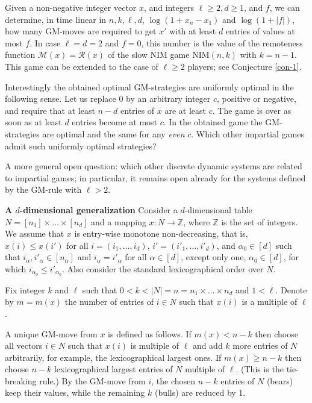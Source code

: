 \documentclass[10pt]{article}
\theoremstyle{definition}
\def\R{\mathcal{R}}
\def\M{\mathcal{M}}
\begin{document}
Given a non-negative integer vector $x$, and  
integers  $\ell \geq 2, d \geq 1$, and $f$,  
we can determine, in time linear in 
$n,k,\ell,d$, $\log(1+x_n-x_1)$ and $\log(1+|f|)$,   
how many GM-moves are required to get 
$x'$  with at least $d$ entries of values at most $f$. 
In case $\ell=d=2$ and $f=0$, this number 
is the value of the remoteness function  $\M(x) = \R(x)$ 
of the slow NIM game NIM$(n,k)$  with $k=n-1$.   
This game can be extended to the case of $\ell \geq 2$ players; 
see Conjecture \ref{con-1}.

Interestingly the obtained optimal GM-strategies 
are uniformly optimal in the following sense. 
Let us replace  0  by an arbitrary 
integer $c$, positive or negative, and  
require that at least  $n - d$ entries of  $x$ are at least $c$. 
The game is over as soon as at least 
$d$  entries become at most  $c$. 
In the obtained game 
the GM-strategies are optimal and 
the same for any {\em even} $c$. 
Which other impartial games admit such 
uniformly optimal strategies? 

A more general open question:     
which other discrete dynamic systems 
are related to impartial games;  
in particular, it remains open 
already for the systems defined 
by the GM-rule with $\ell > 2$. 

 \bigskip 

 {\bf A $d$-dimensional generalization} 
 \newline
 Consider a $d$-dimensional table 
 $N = [n_1] \times \dots \times [n_d]$ 
 and a mapping  $x : N \to \mathbb{Z}$, 
 where $\mathbb{Z}$ is the set of integers. 
 We assume that  $x$  is entry-wise 
 monotone non-decreasing, that is, 
 $x(i) \leq x(i')$  for all 
 $i = (i_1, \dots, i_d)$, 
 $i' = (i'_1, \dots, i'_d)$, 
 and  $\alpha_0 \in [d]$  such that 
$i_\alpha, i'_\alpha \in [n_\alpha]$  and 
 $i_\alpha = i'_\alpha$  for all  $\alpha \in [d]$, 
 except only one, $\alpha_0 \in [d]$,  
 for which  $i_{\alpha_0} \leq i'_{\alpha_0}$. 
 Also consider the standard lexicographical order over $N$. 
 
Fix integer $k$ and $\ell$  such that 
$0 < k < |N| = n = n_1 \times \dots \times n_d$  and $1 < \ell$.
Denote by $m = m(x)$  the number of entries of 
$i \in N$  such that $x(i)$ is a multiple of $\ell$. 

A unique GM-move from $x$ is defined as follows. 
If $m(x) < n-k$  
then choose all vectors $i \in N$  such that 
$x(i)$ is multiple of $\ell$  and 
add  $k$  more entries of  $N$ arbitrarily, 
for example, the lexicographical largest ones. 
If $m(x) \geq n-k$ then choose 
$n-k$  lexicographical largest entries of $N$ 
multiple of $\ell$. 
(This is the tie-breaking rule.)  
By the GM-move from $i$, 
the chosen $n-k$ entries of $N$ (bears) keep their values, 
while the remaining $k$  (bulls) are reduced by 1.  
\end{document}

